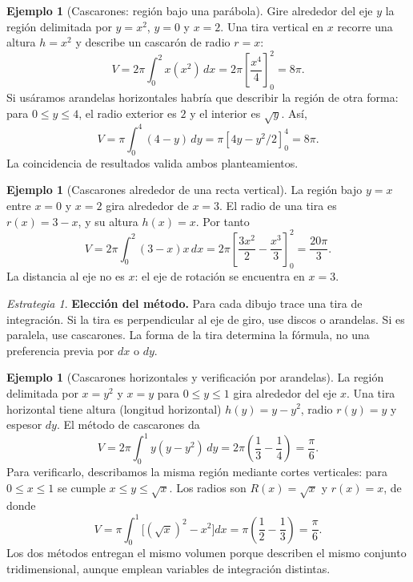 \documentclass[12pt]{article}
\theoremstyle{definition}
\newtheorem{ejemplo}[teorema]{Ejemplo}
\theoremstyle{remark}
\newtheorem*{estrategia}{Estrategia}
\newcommand{\dd}{\,dx}
\begin{document}
\begin{ejemplo}[Cascarones: región bajo una parábola]
Gire alrededor del eje $y$ la región delimitada por $y=x^2$, $y=0$ y $x=2$. Una tira vertical en $x$ recorre una altura $h=x^2$ y describe un cascarón de radio $r=x$:
\[V=2\pi\int_0^2 x(x^2)\dd
=2\pi\left[\frac{x^4}{4}\right]_0^2
=\boxed{8\pi}.\]
Si usáramos arandelas horizontales habría que describir la región de otra forma: para $0\le y\le4$, el radio exterior es $2$ y el interior es $\sqrt y$. Así,
\[V=\pi\int_0^4(4-y)\,dy
=\pi[4y-y^2/2]_0^4=8\pi.\]
La coincidencia de resultados valida ambos planteamientos.
\end{ejemplo}
\begin{ejemplo}[Cascarones alrededor de una recta vertical]
La región bajo $y=x$ entre $x=0$ y $x=2$ gira alrededor de $x=3$. El radio de una tira es $r(x)=3-x$, y su altura $h(x)=x$. Por tanto
\[V=2\pi\int_0^2(3-x)x\dd
=2\pi\left[\frac{3x^2}{2}-\frac{x^3}{3}\right]_0^2
=\boxed{\frac{20\pi}{3}}.\]
La distancia al eje no es $x$: el eje de rotación se encuentra en $x=3$.
\end{ejemplo}
\begin{estrategia}
\textbf{Elección del método.} Para cada dibujo trace una tira de integración. Si la tira es perpendicular al eje de giro, use discos o arandelas. Si es paralela, use cascarones. La forma de la tira determina la fórmula, no una preferencia previa por $dx$ o $dy$.
\end{estrategia}


\begin{ejemplo}[Cascarones horizontales y verificación por arandelas]
La región delimitada por $x=y^2$ y $x=y$ para $0\le y\le1$ gira alrededor del eje $x$. Una tira horizontal tiene altura (longitud horizontal) $h(y)=y-y^2$, radio $r(y)=y$ y espesor $dy$. El método de cascarones da
\[
V=2\pi\int_0^1 y(y-y^2)\,dy
=2\pi\left(\frac13-\frac14\right)
=\boxed{\frac\pi6}.
\]
Para verificarlo, describamos la misma región mediante cortes verticales: para $0\le x\le1$ se cumple $x\le y\le\sqrt x$. Los radios son $R(x)=\sqrt x$ y $r(x)=x$, de donde
\[
V=\pi\int_0^1\bigl[(\sqrt x)^2-x^2\bigr]dx
=\pi\left(\frac12-\frac13\right)
=\frac\pi6.
\]
Los dos métodos entregan el mismo volumen porque describen el mismo conjunto tridimensional, aunque emplean variables de integración distintas.
\end{ejemplo}

\end{document}
